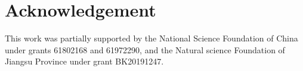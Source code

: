 \documentclass[sigconf,screen]{acmart}
\begin{document}
\section*{Acknowledgement}
This work was partially supported by the National Science Foundation of China
under grants 61802168 and 61972290, and the Natural science Foundation of
Jiangsu Province under grant BK20191247.



\clearpage\newpage


%

\end{document}
